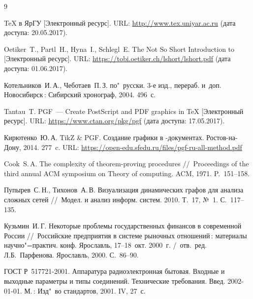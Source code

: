 \documentclass[a4paper,12pt]{diplom}
\begin{document}
\renewcommand{\bibname}{Список литературы} 
\begin{thebibliography}{9}

	TeX в ЯрГУ [Электронный ресурс].
	URL: \url{http://www.tex.uniyar.ac.ru}
	(дата доступа: 20.05.2017).

	Oetiker~T., Partl~H., Hyna~I., Schlegl~E. 
	The Not So Short Introduction to {\LaTeXe} [Электронный ресурс].
	URL: \url{https://tobi.oetiker.ch/lshort/lshort.pdf}
	(дата доступа: 01.06.2017).

	Котельников~И.\,А., Чеботаев~П.\,З.
	\LaTeXe{} по"~русски. 3-е изд., перераб. и~доп.
	Новосибирск\,: Сибирский хронограф, 2004. 496~с.

	Tantau~T.
	PGF~--- Create PostScript and PDF graphics in {\TeX} [Электронный ресурс].
	URL: \url{https://www.ctan.org/pkg/pgf}
	(дата доступа: 17.05.2017).

	Кирютенко~Ю.\,А.
	TikZ \& PGF. Создание графики в \LaTeXe-документах. Ростов-на-Дону, 2014. 277~c.
	URL: \url{https://open-edu.sfedu.ru/files/pgf-ru-all-method.pdf}


	Cook~S.\,A. 
	The complexity of theorem-proving procedures
	//~Proceedings of the third annual ACM symposium on Theory of computing. 
	ACM, 1971. P.~151--158.

	Пупырев~С.\,Н., Тихонов~А.\,В.
	Визуализация динамических графов для анализа сложных сетей
	//~Модел. и анализ информ. систем. 
	2010. Т.~17, №~1. С.~117--135.

	Кузьмин~И.\,Г. 
	Некоторые проблемы государственных финансов в современной России
	//~Российские предприятия в системе рыночных отношений\,: материалы научно"=практич. конф. Ярославль, 17--18~окт. 2000~г. /~отв.~ред. Л.Б.~Парфенова.  Ярославль, 2000.  С.~86--90.
	
	ГОСТ Р~517721-2001.
	Аппаратура радиоэлектронная бытовая. Входные и выходные параметры и типы соединений. Технические требования.  Введ. 2002-01-01. М.\,: Изд"~во стандартов, 2001. IV, 27~с.
	
\end{thebibliography}
\end{document}
